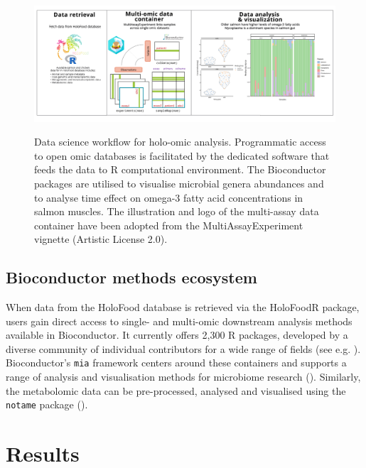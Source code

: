 \documentclass[unnumsec,webpdf,namedate,modern,large]{oup-authoring-template}%
\begin{document}
\vspace{-1em}

\begin{figure}[t]
	\centering
    \includegraphics[width=1\textwidth]{holofoodr_workflow_9.png}
    \label{fig:workflow}
    \caption{Data science workflow for holo-omic analysis. Programmatic access to open omic databases is facilitated by the dedicated software that feeds the data to R computational environment. The Bioconductor packages are utilised to visualise microbial genera abundances and to analyse  time effect on omega-3 fatty acid concentrations in salmon muscles. The illustration and logo of the multi-assay data container have been adopted from the MultiAssayExperiment vignette (Artistic License 2.0).}
	\label{fig:workflow}
\end{figure}

\vspace{-1em}
\subsection{Bioconductor methods ecosystem}

When data from the HoloFood database is retrieved via the HoloFoodR package, users gain direct access to single- and multi-omic downstream analysis methods available in Bioconductor. It currently offers 2,300 R packages, developed by a diverse community of individual contributors for a wide range of fields (see e.g. \cite{gentleman_bioconductor_2004,callahan_bioconductor_2016,amezquita_orchestrating_2020,drnevich_2025}). Bioconductor's \texttt{mia} framework centers around these containers and supports a range of analysis and visualisation methods for microbiome research (\cite{mia, miaViz, oma}). Similarly, the metabolomic data can be pre-processed, analysed and visualised using the \texttt{notame} package (\cite{klavus_2020}).

\section{Results}
\end{document}
